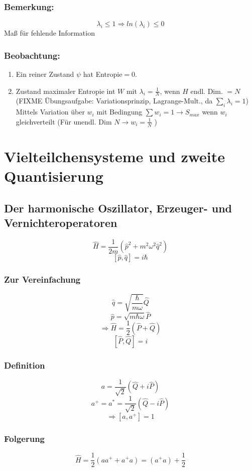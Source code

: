 \documentclass[twoside,a4paper]{scrartcl}
\renewcommand{\1}{\mathds{1}}
\newcommand{\Ra}{\Rightarrow}
\newcommand{\ra}{\rightarrow}
\renewcommand{\l}{\lambda}
\begin{document}
\subsubsection*{Bemerkung:} 
$$\l_i\leq 1 \Ra ln(\l_i)\leq 0$$
Maß für fehlende Information
\subsubsection*{Beobachtung:} 
\begin{enumerate}
\item Ein reiner Zustand $\psi$ hat Entropie$=0$.
\item Zustand maximaler Entropie int $W$ mit $\l_i=\frac{1}{N}$, wenn $H$ endl. Dim. $=N$ (FIXME Übungsaufgabe: Variationsprinzip, Lagrange-Mult., da $\sum_i \l_i=1$)\\
Mittels Variation über $w_i$ mit Bedingung $\sum w_i=1 \ra S_{max}$ wenn $w_i$ gleichverteilt (Für unendl. Dim $N\ra w_i=\frac{1}{N}$ ) 
\end{enumerate}


\section{Vielteilchensysteme und zweite Quantisierung} 
\subsection{Der harmonische Oszillator, Erzeuger- und Vernichteroperatoren} 
$$\hat H=\frac{1}{2m}(\hat p^2+m^2\omega^2\hat q^2)$$
$$[\hat p, \hat q]=i\hbar$$
\subsubsection*{Zur Vereinfachung} 
$$\hat q=\sqrt{\frac{\hbar}{m\omega}}\hat Q$$
$$\hat p=\sqrt{m\hbar\omega}\hat P$$
$$\Ra \hat H=\frac{1}{2}(\hat P+ \hat Q)$$
$$[\hat P, \hat Q]=i$$
\subsubsection*{Definition} 
$$a=\frac{1}{\sqrt{2}}(\hat Q+i\hat P)$$
$$a^+=a^*=\frac{1}{\sqrt{2}}(\hat Q-i\hat P)$$
$$\Ra [a,a^+]=1$$
\subsubsection*{Folgerung} 
$$\hat H=\frac{1}{2}(aa^++a^+a)=(a^+a)+\frac{1}{2}$$
\end{document}
